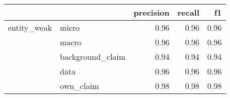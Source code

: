 \begin{tabular}{llrrr}
\toprule
            &           &  precision &  recall &   f1 \\
\midrule
entity\_weak & micro &       0.96 &    0.96 & 0.96 \\
            & macro &       0.96 &    0.96 & 0.96 \\
            & background\_claim &       0.94 &    0.94 & 0.94 \\
            & data &       0.96 &    0.96 & 0.96 \\
            & own\_claim &       0.98 &    0.98 & 0.98 \\
\bottomrule
\end{tabular}
